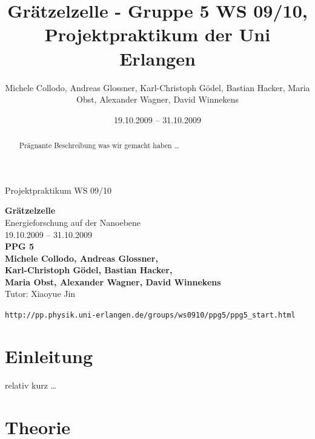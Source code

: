 \documentclass[11pt]{scrartcl}
\title{Gr\"atzelzelle - Gruppe 5 WS 09/10, Projektpraktikum der Uni Erlangen}
\date{19.10.2009 -- 31.10.2009}
\author{Michele Collodo, Andreas Glossner, Karl-Christoph G\"odel, Bastian Hacker, Maria Obst, Alexander Wagner, David Winnekens}
\begin{document}
\sloppy %
\thispagestyle{empty}
\large{Projektpraktikum WS 09/10}
\hfill
{}
\\[8\baselineskip]
\begin{center}
{\Huge\textbf{Gr\"atzelzelle}}
\\[0.5\baselineskip]
{\large Energieforschung auf der Nanoebene}
\\[1.5\baselineskip]
{\Large 19.10.2009 -- 31.10.2009}
\\[6\baselineskip]
{\Huge\textbf{PPG 5}}\\[0.5\baselineskip]
{\large\textbf{
Michele Collodo,
Andreas Glossner,\\
Karl-Christoph G\"odel,
Bastian Hacker,\\
Maria Obst,
Alexander Wagner,
David Winnekens}\\
Tutor: Xiaoyue Jin}
\vfill



\small{\texttt{http://pp.physik.uni-erlangen.de/groups/ws0910/ppg5/ppg5\_start.html}}
\end{center}
\newpage



\tableofcontents
\vfill



\begin{abstract}

Pr\"agnante Beschreibung was wir gemacht haben \ldots
\end{abstract}
\newpage





\section{Einleitung}
relativ kurz \ldots





\section{Theorie}
\end{document}

